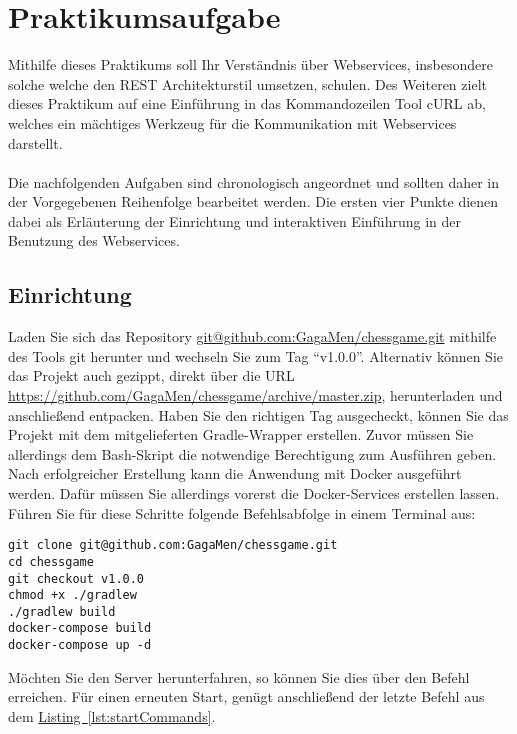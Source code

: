 \chapter{Praktikumsaufgabe}\label{chap:Appendix:A}
Mithilfe dieses Praktikums soll Ihr Verständnis über Webservices, insbesondere solche welche den REST Architekturstil umsetzen, schulen. Des Weiteren zielt dieses Praktikum auf eine Einführung in das Kommandozeilen Tool cURL ab, welches ein mächtiges Werkzeug für die Kommunikation mit Webservices darstellt.\\
\\
Die nachfolgenden Aufgaben sind chronologisch angeordnet und sollten daher in der Vorgegebenen Reihenfolge bearbeitet werden. Die ersten vier Punkte dienen dabei als Erläuterung der Einrichtung und interaktiven Einführung in der Benutzung des Webservices. 

\section{Einrichtung}
Laden Sie sich das Repository \url{git@github.com:GagaMen/chessgame.git} mithilfe des Tools git herunter und wechseln Sie zum Tag \enquote{v1.0.0}. Alternativ können Sie das Projekt auch gezippt, direkt über die \gls{URL} \url{https://github.com/GagaMen/chessgame/archive/master.zip}, herunterladen und anschließend entpacken. Haben Sie den richtigen Tag ausgecheckt, können Sie das Projekt mit dem mitgelieferten Gradle-Wrapper erstellen. Zuvor müssen Sie allerdings dem Bash-Skript die notwendige Berechtigung zum Ausführen geben. Nach erfolgreicher Erstellung kann die Anwendung mit Docker ausgeführt werden. Dafür müssen Sie allerdings vorerst die Docker-Services erstellen lassen. Führen Sie für diese Schritte folgende Befehlsabfolge in einem Terminal aus:\\
\begin{lstlisting}[style=lstStyleFramed, caption={Befehlsabfolge zur Einrichtung des Webservices}, label=lst:startCommands]
git clone git@github.com:GagaMen/chessgame.git
cd chessgame
git checkout v1.0.0
chmod +x ./gradlew
./gradlew build
docker-compose build
docker-compose up -d
\end{lstlisting}
Möchten Sie den Server herunterfahren, so können Sie dies über den Befehl  erreichen. Für einen erneuten Start, genügt anschließend der letzte Befehl aus dem \hyperref[lst:startCommands]{Listing~\ref{lst:startCommands}}.

